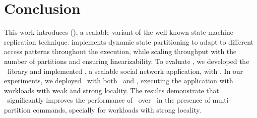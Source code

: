 \section{Conclusion}
\label{sec:conclusion}

This work introduces \dssmrlong{} (\dssmr), a scalable variant of the well-known state machine replication technique. 
\dssmr{} implements dynamic state partitioning to adapt to different access patterns throughout the execution, while scaling throughput with the number of partitions and ensuring linearizability.
To evaluate \dssmr{}, we developed the \libname\ library and implemented \appname{}, a scalable social network application, with \libname{}.
In our experiments, we deployed \appname\ with both \dssmr\ and \ssmr{}, executing the application with workloads with weak and strong locality.
The results demonstrate that \dssmr\ significantly improves the performance of \appname\ over \ssmr\ in the presence of multi-partition commands, specially for workloads with strong locality.

\clearpage